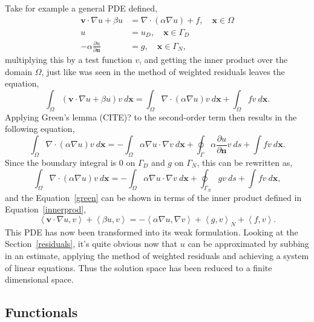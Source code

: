 Take for example a general PDE defined,
\begin{align}
	\mathbf{v}\cdot\nabla u + \beta u &= \nabla\cdot(\alpha\nabla u) + f,\quad  \mathbf{x} \in \Omega \\
	u &= u_D,\quad \mathbf{x} \in \Gamma_D\\
	-\alpha\frac{\partial u}{\partial \mathbf{n}} &= g,\quad \mathbf{x} \in \Gamma_N,
\end{align}
multiplying this by a test function $v$, and getting the inner product over the domain $\Omega$, just like was seen in the method of weighted residuals leaves the equation,
\begin{equation}\label{green}
		\int_{\Omega}(\mathbf{v}\cdot\nabla u + \beta u)v~d\mathbf{x} = \int_{\Omega}\nabla\cdot(\alpha\nabla u)v~d\mathbf{x} + \int_{\Omega}fv~d\mathbf{x}.
\end{equation}
Applying Green's lemma (CITE)? to the second-order term then results in the following equation,
\begin{equation}
	\int_{\Omega}\nabla\cdot(\alpha\nabla u)v~d\mathbf{x} = -\int_{\Omega}\alpha\nabla u\cdot \nabla v~d\mathbf{x} + \oint_{\Gamma} \alpha \frac{\partial u}{\partial \mathbf{n}} v~ds + \int fv~d\mathbf{x}.
\end{equation}
Since the boundary integral is $0$ on $\Gamma_D$ and $g$ on $\Gamma_N$, this can be rewritten as,
\begin{equation}
	\int_{\Omega}\nabla\cdot(\alpha\nabla u)v~d\mathbf{x} = -\int_{\Omega}\alpha\nabla u\cdot \nabla v~d\mathbf{x} + \oint_{\Gamma_N} gv~ds + \int fv~d\mathbf{x},
\end{equation}
and the Equation~\eqref{green} can be shown in terms of the inner product defined in Equation~\eqref{innerprod},
\begin{equation}\label{weak}
	\left\langle\mathbf{v}\cdot\nabla u,v\right\rangle + \left\langle\beta u,v\right\rangle = -\left\langle\alpha\nabla u, \nabla v\right\rangle + \left\langle g,v\right\rangle_N + \left\langle f,v\right\rangle.
\end{equation}
This PDE has now been transformed into its weak formulation. Looking at the Section~\ref{residuals}, it's quite obvious now that $u$ can be approximated by subbing in an estimate, applying the method of weighted residuals and achieving a system of linear equations. Thus the solution space has been reduced to a finite dimensional space.

\subsection{Functionals}\label{functionals}

